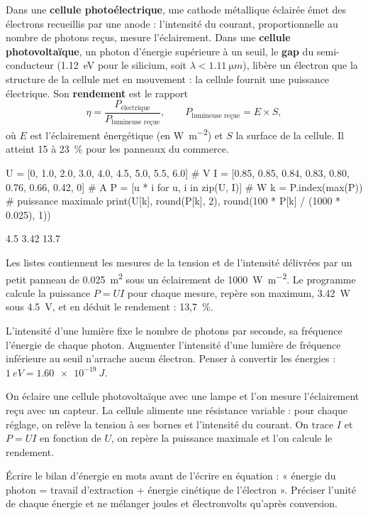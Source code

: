 \begin{propriete}
Dans une \textbf{cellule photoélectrique}, une cathode métallique éclairée émet des électrons recueillis par une anode :
l'intensité du courant, proportionnelle au nombre de photons reçus, mesure l'éclairement. Dans une \textbf{cellule
photovoltaïque}, un photon d'énergie supérieure à un seuil, le \textbf{gap} du semi-conducteur (\qty{1,12}{eV} pour le
silicium, soit $\lambda<\qty{1,11}{\micro m}$), libère un électron que la structure de la cellule met en mouvement : la cellule
fournit une puissance électrique. Son \textbf{rendement} est le rapport
\[\eta=\frac{P_\text{électrique}}{P_\text{lumineuse reçue}},\qquad P_\text{lumineuse reçue}=E\times S,\]
où $E$ est l'éclairement énergétique (en \unit{W.m^{-2}}) et $S$ la surface de la cellule. Il atteint 15 à 23~\% pour les
panneaux du commerce.
\end{propriete}
\begin{python}
U = [0, 1.0, 2.0, 3.0, 4.0, 4.5, 5.0, 5.5, 6.0]           # V
I = [0.85, 0.85, 0.84, 0.83, 0.80, 0.76, 0.66, 0.42, 0]   # A
P = [u * i for u, i in zip(U, I)]                          # W
k = P.index(max(P))                                        # puissance maximale
print(U[k], round(P[k], 2), round(100 * P[k] / (1000 * 0.025), 1))
\end{python}
\begin{console}
4.5 3.42 13.7
\end{console}
\noindent{}Les listes contiennent les mesures de la tension et de l'intensité délivrées par un petit
panneau de \qty{0,025}{m^2} sous un éclairement de \qty{1000}{W.m^{-2}}. Le programme calcule la puissance $P=UI$ pour chaque
mesure, repère son maximum, \qty{3,42}{W} sous \qty{4,5}{V}, et en déduit le rendement : 13,7~\%.
\begin{attention}
L'intensité d'une lumière fixe le nombre de photons par seconde, sa fréquence l'énergie de chaque photon. Augmenter
l'intensité d'une lumière de fréquence inférieure au seuil n'arrache aucun électron. Penser à convertir les énergies :
$\qty{1}{eV}=\qty{1,60e-19}{J}$.
\end{attention}
\begin{experience}
On éclaire une cellule photovoltaïque avec une lampe et l'on mesure l'éclairement reçu avec un capteur. La cellule
alimente une résistance variable : pour chaque réglage, on relève la tension à ses bornes et l'intensité du courant. On
trace $I$ et $P=UI$ en fonction de $U$, on repère la puissance maximale et l'on calcule le rendement.
\end{experience}
\begin{rediger}
Écrire le bilan d'énergie en mots avant de l'écrire en équation : « énergie du photon = travail d'extraction + énergie
cinétique de l'électron ». Préciser l'unité de chaque énergie et ne mélanger joules et électronvolts qu'après conversion.
\end{rediger}
\exercices

